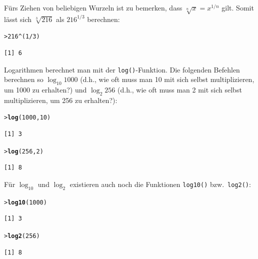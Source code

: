 \documentclass[oneside, 10pt]{book}\usepackage[]{graphicx}\usepackage[]{xcolor}
\makeatletter
\newcommand{\hlnum}[1]{\textcolor[rgb]{0.686,0.059,0.569}{#1}}%
\newcommand{\hlopt}[1]{\textcolor[rgb]{0,0,0}{#1}}%
\newcommand{\hlstd}[1]{\textcolor[rgb]{0.345,0.345,0.345}{#1}}%
\newcommand{\hlkwd}[1]{\textcolor[rgb]{0.737,0.353,0.396}{\textbf{#1}}}%
\newenvironment{kframe}{%
 \def\at@end@of@kframe{}%
 \ifinner\ifhmode%
  \def\at@end@of@kframe{\end{minipage}}%
  \begin{minipage}{\columnwidth}%
 \fi\fi%
 \def\FrameCommand##1{\hskip\@totalleftmargin \hskip-\fboxsep
 \colorbox{shadecolor}{##1}\hskip-\fboxsep
     \hskip-\linewidth \hskip-\@totalleftmargin \hskip\columnwidth}%
 \MakeFramed {\advance\hsize-\width
   \@totalleftmargin\z@ \linewidth\hsize
   \@setminipage}}%
 {\par\unskip\endMakeFramed%
 \at@end@of@kframe}
\newenvironment{knitrout}{}{} %
\makeatother
\begin{document}
Fürs Ziehen von beliebigen Wurzeln ist zu bemerken, dass $\sqrt[n]{x} = x^{1/n}$ gilt.
Somit lässt sich $\sqrt[3]{216}$ als $216^{1/3}$ berechnen:

\begin{knitrout}
\color{fgcolor}\begin{kframe}
\begin{alltt}
\hlstd{> }\hlnum{216} \hlopt{^} \hlstd{(}\hlnum{1}\hlopt{/}\hlnum{3}\hlstd{)}
\end{alltt}
\begin{verbatim}
[1] 6
\end{verbatim}
\end{kframe}
\end{knitrout}

Logarithmen berechnet man mit der \texttt{log()}-Funktion.
Die folgenden Befehlen berechnen so $\log_{10} 1000$ 
(d.h., wie oft muss man 10 mit sich selbst multiplizieren, um 1000 zu erhalten?) und 
$\log_2 256$ (d.h., wie oft muss man 2 mit sich selbst multiplizieren, um 256 zu erhalten?):

\begin{knitrout}
\color{fgcolor}\begin{kframe}
\begin{alltt}
\hlstd{> }\hlkwd{log}\hlstd{(}\hlnum{1000}\hlstd{,} \hlnum{10}\hlstd{)}
\end{alltt}
\begin{verbatim}
[1] 3
\end{verbatim}
\begin{alltt}
\hlstd{> }\hlkwd{log}\hlstd{(}\hlnum{256}\hlstd{,} \hlnum{2}\hlstd{)}
\end{alltt}
\begin{verbatim}
[1] 8
\end{verbatim}
\end{kframe}
\end{knitrout}

Für $\log_{10}$ und $\log_{2}$ existieren auch noch die Funktionen \texttt{log10()} bzw.\ \texttt{log2()}:
\begin{knitrout}
\color{fgcolor}\begin{kframe}
\begin{alltt}
\hlstd{> }\hlkwd{log10}\hlstd{(}\hlnum{1000}\hlstd{)}
\end{alltt}
\begin{verbatim}
[1] 3
\end{verbatim}
\begin{alltt}
\hlstd{> }\hlkwd{log2}\hlstd{(}\hlnum{256}\hlstd{)}
\end{alltt}
\begin{verbatim}
[1] 8
\end{verbatim}
\end{kframe}
\end{knitrout}
\end{document}
